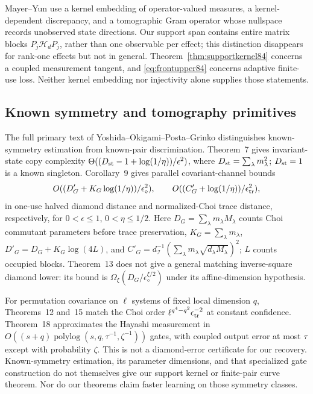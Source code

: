 Mayer--Yun \cite[Theorem~3.6, Definition~3.7 and Remark~4.4]{MY84}
use a kernel embedding of operator-valued measures, a kernel-dependent
discrepancy, and a tomographic Gram operator whose nullspace records
unobserved state directions.  Our support span contains entire
matrix blocks $P_j\mathcal H_dP_j$, rather than one observable
per effect; this distinction disappears for rank-one effects but
not in general.  Theorem~\ref{thm:supportkernel84} concerns a
coupled measurement tangent, and \eqref{eq:frontupper84} concerns
adaptive finite-use loss.  Neither kernel embedding nor injectivity
alone supplies those statements.

\subsection{Known symmetry and tomography primitives}
The full primary text of Yoshida--Okigami--Posta--Grinko
\cite{YOPG84} distinguishes known-symmetry estimation from known-pair
discrimination.  Theorem~7 gives invariant-state copy complexity
$\Theta((D_{\rm st}-1+\log(1/\eta))/\epsilon^2)$, where
$D_{\rm st}=\sum_\lambda m_\lambda^2$; $D_{\rm st}=1$ is a
known singleton.  Corollary~9 gives parallel covariant-channel bounds
\[
 O((D'_G+K_G\log(1/\eta))/\epsilon_\diamond^2),\qquad
 O((C'_G+\log(1/\eta))/\epsilon_{\rm tr}^2),
\]
in one-use halved diamond distance and normalized-Choi trace distance,
respectively, for $0<\epsilon\le1$, $0<\eta\le1/2$.
Here $D_G=\sum_\lambda m_\lambda M_\lambda$ counts Choi commutant
parameters before trace preservation,
$K_G=\sum_\lambda m_\lambda$,
$D'_G=D_G+K_G\log(4L)$, and
$C'_G=d_{\mathcal I}^{-1}(\sum_\lambda m_\lambda
\sqrt{d_\lambda M_\lambda})^2$; $L$ counts occupied blocks.
Theorem~13 does not give a general matching inverse-square diamond
lower: its bound is $\Omega_\xi(D_G/\epsilon_\diamond^{\xi/2})$
under its affine-dimension hypothesis.

For permutation covariance on $\ell$ systems of fixed local dimension
$q$, Theorems~12 and~15 match the Choi order
$\ell^{q^4-q^2}\epsilon_{\rm tr}^{-2}$ at constant confidence.
Theorem~18 approximates the Hayashi measurement in
$O((s+q)\operatorname{polylog}(s,q,\tau^{-1},\zeta^{-1}))$ gates,
with coupled output error at most $\tau$ except with probability
$\zeta$.  This is not a diamond-error certificate for our recovery.
Known-symmetry estimation, its parameter dimensions, and that
specialized gate construction do not themselves give our support
kernel or finite-pair curve theorem.  Nor do our theorems claim
faster learning on those symmetry classes.

